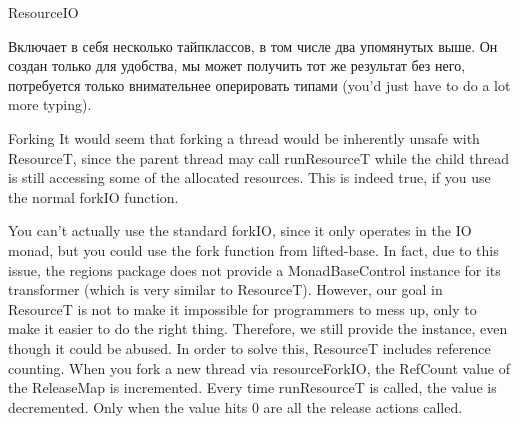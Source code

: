 ResourceIO

Включает в себя несколько тайпклассов, в том числе два
упомянутых выше. Он создан только для удобства, мы может получить тот же результат без
него, потребуется только внимательнее оперировать типами (you'd just have to do a lot
more typing).
   
Forking
It would seem that forking a thread would be inherently unsafe with ResourceT,
since the parent thread may call runResourceT while the child thread is still
accessing some of the allocated resources. This is indeed true, if you use the normal
forkIO function.

You can't actually use the standard forkIO, since it only operates in the
IO monad, but you could use the fork function from
lifted-base. In fact, due to this issue, the regions
package does not provide a MonadBaseControl instance for its transformer (which
is very similar to ResourceT). However, our goal in ResourceT
is not to make it impossible for programmers to mess up, only to make it easier to do the
right
thing. Therefore, we still provide the instance, even though it could be abused.
In order to solve this, ResourceT includes reference counting. When you fork a
new thread via resourceForkIO, the RefCount value of the
ReleaseMap is incremented. Every time runResourceT is called,
the value is decremented. Only when the value hits 0 are all the release actions called.
% 
% 
%   
% 
% 
% 
